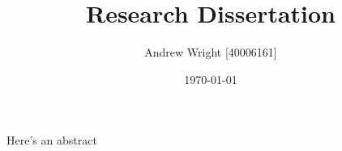 \documentclass[12pt,twocolumn]{article}
\title{Research Dissertation}
\author{Andrew Wright [40006161]}
\date{\today}
\begin{document}
\maketitle

\abstract{}
Here's an abstract








\end{document}
